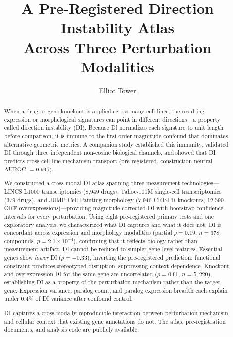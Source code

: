 \documentclass[11pt]{article}
\title{A Pre-Registered Direction Instability Atlas\\
Across Three Perturbation Modalities}
\author{Elliot Tower}
\affil{Independent researcher \\ \texttt{elliot@elliottower.ai}}
\date{}
\begin{document}
\maketitle

\begin{abstract}
When a drug or gene knockout is applied across many cell lines, the
resulting expression or morphological signatures can point in different
directions---a property called direction instability (DI).  Because DI
normalizes each signature to unit length before comparison, it is immune
to the first-order magnitude confound that dominates alternative
geometric metrics.  A companion study established this immunity, validated
DI through three independent non-cosine biological channels, and showed
that DI predicts cross-cell-line mechanism transport (pre-registered,
construction-neutral AUROC $= 0.945$).

We constructed a cross-modal DI atlas spanning three measurement
technologies---LINCS L1000 transcriptomics (8{,}949 drugs), Tahoe-100M
single-cell transcriptomics (379 drugs), and JUMP Cell Painting
morphology (7{,}946 CRISPR knockouts, 12{,}590 ORF
overexpressions)---providing magnitude-corrected DI with bootstrap
confidence intervals for every perturbation.  Using eight pre-registered
primary tests and one exploratory analysis, we characterized what DI
captures and what it does not.  DI is
concordant across expression and morphology modalities (partial
$\rho = 0.19$, $n = 378$ compounds, $p = 2.1 \times 10^{-4}$),
confirming that it reflects biology rather than measurement artifact.
DI cannot be reduced to simpler gene-level features.
Essential genes show \emph{lower} DI ($\rho = -0.33$), inverting the
pre-registered prediction: functional constraint produces stereotyped
disruption, suppressing context-dependence.  Knockout and overexpression
DI for the same gene are uncorrelated ($\rho = 0.01$,
$n = 5{,}220$), establishing DI as a property of the perturbation
mechanism rather than the target gene.  Expression variance, paralog
count, and paralog expression breadth each explain under 0.4\% of DI
variance after confound control.

DI captures a cross-modally reproducible interaction between
perturbation mechanism and cellular context that existing gene
annotations do not.  The atlas, pre-registration documents, and analysis
code are publicly available.
\end{abstract}
\end{document}
